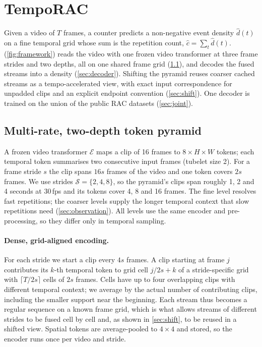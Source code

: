 \section{TempoRAC}
\label{sec:method}

Given a video of $T$ frames, a counter predicts a non-negative event density
$\hat d(t)$ on a fine temporal grid whose sum is the repetition count,
$\hat c=\sum_t\hat d(t)$. \method (\cref{fig:framework}) reads the video with one
frozen video transformer at three frame strides and two depths, all on one shared
frame grid (\cref{sec:pyramid}), and decodes the fused streams into a density
(\cref{sec:decoder}). Shifting the pyramid reuses coarser cached streams as a
tempo-accelerated view, with exact input correspondence for unpadded clips and
an explicit endpoint convention (\cref{sec:shift}). One decoder is trained on the union of the public RAC
datasets (\cref{sec:joint}).

\subsection{Multi-rate, two-depth token pyramid}
\label{sec:pyramid}
A frozen video transformer $\mathcal{E}$ maps a clip of 16 frames to
$8\times H\times W$ tokens; each temporal token summarises two consecutive input
frames (tubelet size 2). For a frame stride $s$ the clip spans $16s$ frames of
the video and one token covers $2s$ frames. We use strides
$\mathcal{S}=\{2,4,8\}$, so the pyramid's clips span roughly 1, 2 and 4 seconds
at 30\,fps and its tokens cover 4, 8 and 16 frames. The fine level resolves
fast repetitions; the coarser levels supply the longer temporal context that
slow repetitions need (\cref{sec:observation}). All levels use the same encoder and
pre-processing, so they differ only in temporal sampling.

\paragraph{Dense, grid-aligned encoding.}
For each stride we start a clip every $4s$ frames. A clip starting at frame $j$
contributes its $k$-th temporal token to grid cell $j/2s+k$ of a stride-specific
grid with $\lceil T/2s\rceil$ cells of $2s$ frames. Cells have up to
four overlapping clips with different temporal context; we average by the actual
number of contributing clips, including the smaller support near the beginning.
Each stream thus becomes a regular sequence on a known frame grid, which is what
allows streams of different strides to be fused cell by cell and, as shown in
\cref{sec:shift}, to be reused in a shifted view. Spatial tokens are average-pooled to
$4\times4$ and stored, so the encoder runs once per video and stride.

